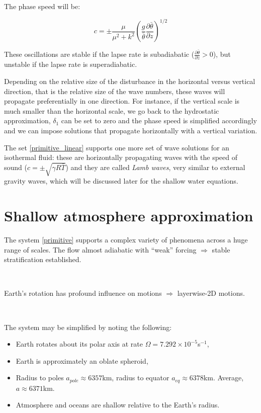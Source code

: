 The phase speed will be:

\begin{equation}
	c = \pm \frac{\mu}{\mu^2+k^2} (\frac{g}{\bar{\theta}} \frac{\partial \bar{\theta}}{\partial z} )^{1/2}
\end{equation}

These oscillations are stable if the lapse rate is subadiabatic ($\frac{\partial \bar{\theta}}{\partial z}>0$), but unstable if the lapse rate is superadiabatic.

Depending on the relative size of the disturbance in the horizontal versus vertical direction, that is the relative size of the wave numbers, these waves will propagate preferentially in one direction. For instance, if the vertical scale is much smaller than the horizontal scale, we go back to the hydrostatic approximation, $\delta_1$ can be set to zero and the phase speed is simplified accordingly and we can impose solutions that propagate horizontally with a vertical variation.

The set \ref{primitive_linear} supports one more set of wave solutions for an isothermal fluid: these are horizontally propagating waves with the speed of sound ($c=\pm \sqrt{\gamma R \bar{T}}$) and they are called \emph{Lamb waves}, very similar to external gravity waves, which will be discussed later for the shallow water equations.

\section{Shallow atmosphere approximation} 

The system \ref{primitive} supports a complex variety of phenomena across a huge range of scales. The flow almost adiabatic with ``weak'' forcing $\Rightarrow$ stable
stratification established.

~

Earth's rotation has profound influence on motions $\Rightarrow$
layerwise-2D motions.

~

The system may be simplified by noting the following:

\begin{itemize}
	\item
	Earth rotates about its polar axis at rate $\Omega=7.292 \times 10^{-5}$s$^{-1}$,
	
	\item
	Earth is approximately an oblate spheroid,
	
	\item 
	Radius to poles $a_{pole}\approx 6357$km, radius to equator $a_{eq}\approx
	6378$km. Average, $a\approx 6371$km.
	
	\item
	Atmosphere and oceans are shallow relative to the Earth's radius.
\end{itemize}

